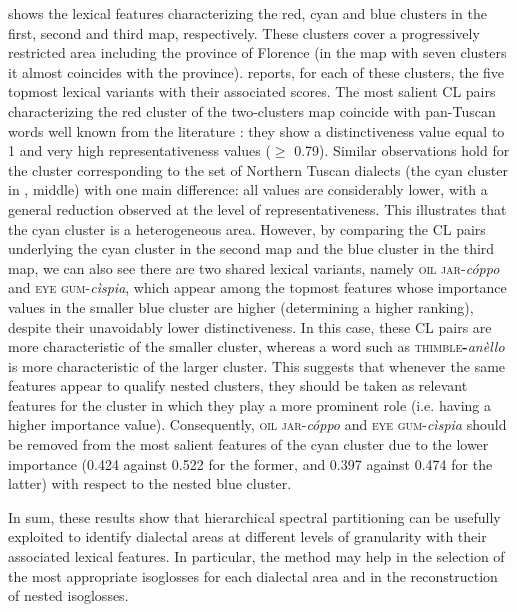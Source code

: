 \documentclass[output=paper]{LSP/langsci}
\begin{document}
 shows the lexical features characterizing the red, cyan and blue clusters in the first, second and third map, respectively. These clusters cover a progressively restricted area including the province of Florence (in the map with seven clusters it almost coincides with the province).  reports, for each of these clusters, the five topmost lexical variants with their associated scores. The most salient CL pairs characterizing the red cluster of the two-clusters map coincide with pan-Tuscan words well known from the literature \citep{giacomelli_parole_1984}: they show a distinctiveness value equal to 1 and very high representativeness values (${\geq}$ 0.79). Similar observations hold for the cluster corresponding to the set of Northern Tuscan dialects (the cyan cluster in , middle) with one main difference: all values are considerably lower, with a general reduction observed at the level of representativeness. This illustrates that the cyan cluster is a heterogeneous area. However, by comparing the CL pairs underlying the cyan cluster in the second map and the blue cluster in the third map, we can also see there are two shared lexical variants, namely \textsc{oil jar}{}-\textit{cóppo }and \textsc{eye gum}{}-\textit{cìspia}, which appear among the topmost features whose importance values in the smaller blue cluster are higher (determining a higher ranking), despite their unavoidably lower distinctiveness. In this case, these CL pairs are more characteristic of the smaller cluster, whereas a word such as \textsc{thimble}\textbf{\textsc{{}-}}\textit{anèllo }is more characteristic of the larger cluster. This suggests that whenever the same features appear to qualify nested clusters, they should be taken as relevant features for the cluster in which they play a more prominent role (i.e. having a higher importance value). Consequently, \textsc{oil jar}{}-\textit{cóppo }and \textsc{eye gum}{}-\textit{cìspia }should be removed from the most salient features of the cyan cluster due to the lower importance (0.424 against 0.522 for the former, and 0.397 against 0.474 for the latter) with respect to the nested blue cluster.

In sum, these results show that hierarchical spectral partitioning can be usefully exploited to identify dialectal areas at different levels of granularity with their associated lexical features. In particular, the method may help in the selection of the most appropriate isoglosses for each dialectal area and in the reconstruction of nested isoglosses.
\end{document}
